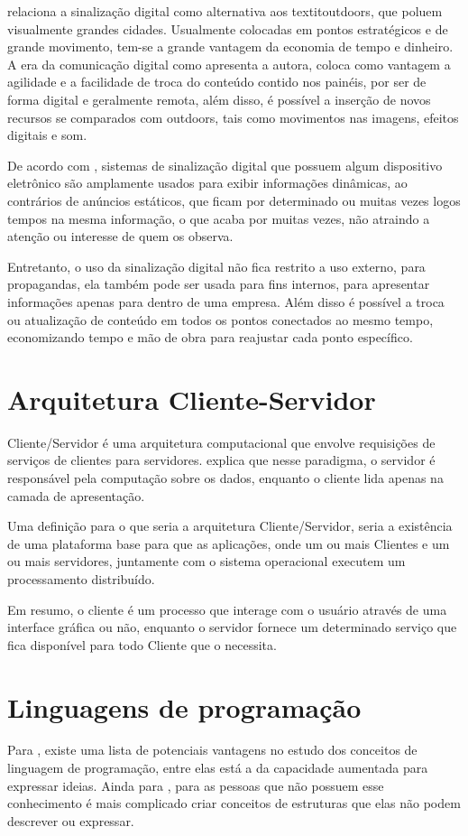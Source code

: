 \cite[p.11]{cintra2010} relaciona a sinalização digital como alternativa aos textit{outdoors}, que poluem visualmente grandes cidades. Usualmente colocadas em pontos estratégicos e de grande movimento, tem-se a grande vantagem da economia de tempo e dinheiro. A era da comunicação digital como apresenta a autora, coloca como vantagem a agilidade e a facilidade de troca do conteúdo contido nos painéis, por ser de forma digital e geralmente remota, além disso, é possível a inserção de novos recursos se comparados com outdoors, tais como movimentos nas imagens, efeitos digitais e som.

De acordo com \cite{mishima2016}, sistemas de sinalização
digital que possuem algum dispositivo eletrônico são amplamente usados para exibir informações dinâmicas, ao contrários de anúncios estáticos, que ficam por determinado ou muitas vezes logos tempos na mesma informação, o que acaba por muitas vezes, não atraindo a atenção ou interesse de quem os observa.

Entretanto, o uso da sinalização digital não fica restrito a uso externo, para propagandas, ela também pode ser usada para fins internos, para apresentar informações apenas para dentro de uma empresa. Além disso é possível a troca ou atualização de conteúdo em todos os pontos conectados ao mesmo tempo, economizando tempo e mão de obra para reajustar cada ponto específico.

\section{Arquitetura Cliente-Servidor}
Cliente/Servidor é uma arquitetura computacional que envolve requisições de serviços de clientes para servidores. \cite{cecin2005} explica que nesse paradigma, o servidor é responsável pela computação sobre os dados, enquanto o cliente lida apenas na camada de apresentação.

Uma definição para o que seria a arquitetura Cliente/Servidor, seria a existência de uma plataforma base para que as aplicações, onde um ou mais Clientes e um ou mais servidores, juntamente com o sistema operacional executem um processamento distribuído.

Em resumo, o cliente é um processo que interage com o usuário através de uma interface gráfica ou não, enquanto o servidor fornece um determinado serviço que fica disponível para todo Cliente que o necessita.

\section{Linguagens de programação}
Para \cite{sebesta2011}, existe uma lista de potenciais vantagens no estudo dos conceitos de linguagem de programação, entre elas está a da capacidade aumentada para expressar ideias. Ainda para \cite{sebesta2011}, para as pessoas que não possuem esse conhecimento é mais complicado criar conceitos de estruturas que elas não podem descrever ou expressar. 

